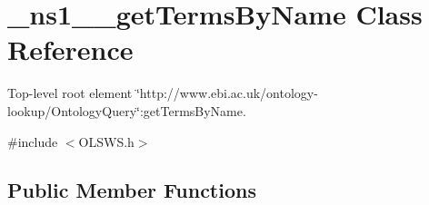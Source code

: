 \hypertarget{class__ns1____getTermsByName}{
\section{\_\-ns1\_\-\_\-getTermsByName Class Reference}
\label{class__ns1____getTermsByName}
}


Top-\/level root element \char`\"{}http://www.ebi.ac.uk/ontology-\/lookup/OntologyQuery\char`\"{}:getTermsByName.  




{\ttfamily \#include $<$OLSWS.h$>$}

\subsection*{Public Member Functions}
